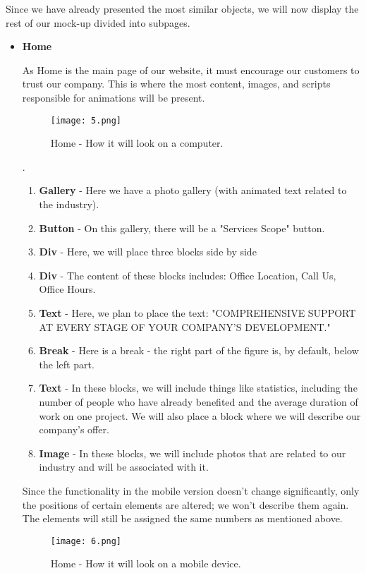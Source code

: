 \documentclass{article}
\begin{document}
Since we have already presented the most similar objects, we will now display the rest of our mock-up divided into subpages.
\par
\begin{itemize}
    \item \textbf{Home} \par
   As Home is the main page of our website, it must encourage our customers to trust our company. This is where the most content, images, and scripts responsible for animations will be present.
\par
   \begin{figure}[h]
    \centering
    \texttt{[image: 5.png]}
    \caption{Home - How it will look on a computer.}
    \label{fig:enter-label}
\end{figure}
.
\begin{enumerate}
    \item \textbf{Gallery} - Here we have a photo gallery (with animated text related to the industry). 
    \item \textbf{Button} - On this gallery, there will be a  "Services Scope" button.
    \item \textbf{Div}  - Here, we will place three blocks side by side
    \item \textbf{Div}  - The content of these blocks includes: Office Location, Call Us, Office Hours.
    \item \textbf{Text} - Here, we plan to place the text: "COMPREHENSIVE SUPPORT AT EVERY STAGE OF YOUR COMPANY'S DEVELOPMENT."
    \item \textbf{Break} -  Here is a break - the right part of the figure is, by default, below the left part.
    \item \textbf{Text} - In these blocks, we will include things like statistics, including the number of people who have already benefited and the average duration of work on one project. We will also place a block where we will describe our company's offer.
    \item \textbf{Image} - In these blocks, we will include photos that are related to our industry and will be associated with it.
\end{enumerate} 

Since the functionality in the mobile version doesn't change significantly, only the positions of certain elements are altered; we won't describe them again. The elements will still be assigned the same numbers as mentioned above.
\par
\clearpage
   \begin{figure}[h]
    \centering
    \texttt{[image: 6.png]}
    \caption{Home - How it will look on a mobile device.}
    \label{fig:enter-label}
\end{figure}


\end{itemize}
\end{document}
